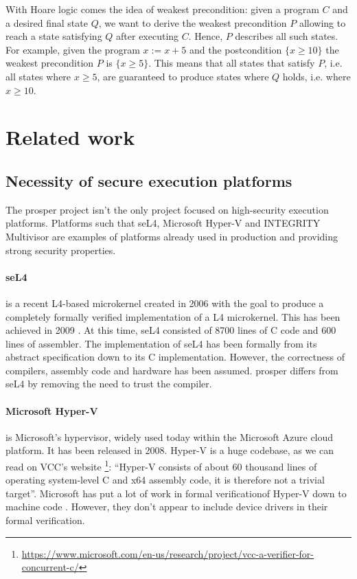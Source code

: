 \documentclass{kththesis}
\begin{document}
With Hoare logic comes the idea of weakest precondition: given a program $C$ and a desired final state $Q$, we want to derive the weakest precondition $P$ allowing to reach a state satisfying $Q$ after executing $C$. Hence, $P$ describes all such states. For example, given the program $x:=x+5$ and the postcondition $\{x \geq 10\}$ the weakest precondition $P$ is $\{x \geq 5\}$. This means that all states that satisfy $P$, i.e. all states where $x \geq 5$, are guaranteed to produce states where $Q$ holds, i.e. where $x \geq 10$.

\section{Related work}

\subsection{Necessity of secure execution platforms}

The \acrshort{prosper} project isn't the only project focused on high-security execution platforms. Platforms such that seL4, Microsoft Hyper-V and INTEGRITY Multivisor are examples of platforms already used in production and providing strong security properties.

\paragraph{seL4} is a recent L4-based microkernel created in 2006 with the goal to produce a completely formally verified implementation of a L4 microkernel. This has been achieved in 2009 \cite{klein_sel4:_2009}. At this time, seL4 consisted of \num{8700} lines of C code and \num{600} lines of assembler. The implementation of seL4 has been formally from its abstract specification down to its C implementation. However, the correctness of compilers, assembly code and hardware has been assumed. \acrshort{prosper} differs from seL4 by removing the need to trust the compiler.

\paragraph{Microsoft Hyper-V} is Microsoft's hypervisor, widely used today within the Microsoft Azure cloud platform. It has been released in 2008. Hyper-V is a huge codebase, as we can read on VCC's website \footnote{\url{https://www.microsoft.com/en-us/research/project/vcc-a-verifier-for-concurrent-c/}}: ``Hyper-V consists of about 60 thousand lines of operating system-level C and x64 assembly code, it is therefore not a trivial target''. Microsoft has put a lot of work in formal verification\footnotemark of Hyper-V down to machine code \cite{leinenbach_verifying_2009}. However, they don't appear to include device drivers in their formal verification.
\end{document}
